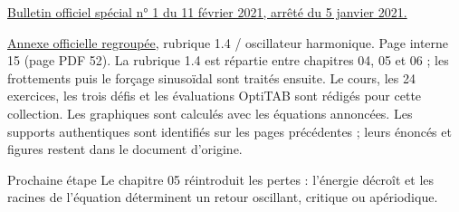 \href{https://www.education.gouv.fr/bo/21/Special1/ESRS2035779A.htm}{Bulletin officiel spécial n° 1 du 11 février 2021, arrêté du 5 janvier 2021.}\par
\href{https://cache.media.education.gouv.fr/file/SPE1-MEN-MESRI-4-2-2021/64/8/spe779_annexe_1373648.pdf}{Annexe officielle regroupée}, rubrique 1.4 / oscillateur harmonique. Page interne 15 (page PDF 52). La rubrique 1.4 est répartie entre chapitres 04, 05 et 06 ; les frottements puis le forçage sinusoïdal sont traités ensuite.
Le cours, les 24 exercices, les trois défis et les évaluations OptiTAB sont rédigés pour cette collection. Les graphiques sont calculés avec les équations annoncées. Les supports authentiques sont identifiés sur les pages précédentes ; leurs énoncés et figures restent dans le document d’origine.
\begin{methode}{Prochaine étape}
Le chapitre 05 réintroduit les pertes : l’énergie décroît et les racines de l’équation déterminent un retour oscillant, critique ou apériodique.
\end{methode}

